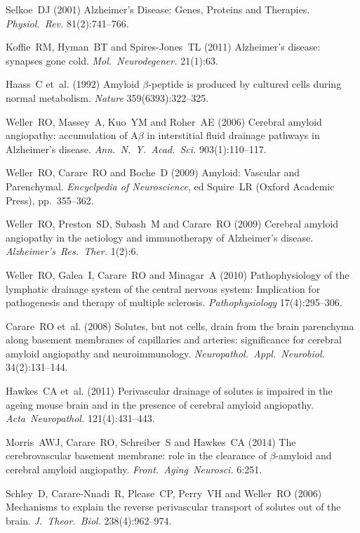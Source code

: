 \documentclass[a4paper,titlepage]{scrartcl}
\begin{document}
\begin{thebibliography}{10}
Selkoe~DJ (2001) Alzheimer's Disease: Genes, Proteins and Therapies. {\em Physiol.~Rev.} 81(2):741--766.

Koffie~RM, Hyman~BT and Spires-Jones~TL (2011) Alzheimer's disease: synapses gone cold. {\em Mol.~Neurodegener.} 21(1):63.

Haass~C et~al. (1992) Amyloid $\beta$-peptide is produced by cultured cells during normal metabolism. {\em Nature} 359(6393):322--325.

Weller~RO, Massey~A, Kuo~YM and Roher~AE (2006) Cerebral amyloid angiopathy: accumulation of A$\beta$ in interstitial fluid drainage pathways in Alzheimer's disease. {\em Ann.~N.~Y.~Acad.~Sci.} 903(1):110--117.

Weller~RO, Carare~RO and Boche~D (2009) Amyloid: Vascular and Parenchymal. {\em Encyclpedia of Neuroscience}, ed Squire~LR (Oxford Academic Press), pp.~355--362.

Weller~RO, Preston~SD, Subash~M and Carare~RO (2009) Cerebral amyloid angiopathy in the aetiology and immunotherapy of Alzheimer's disease. {\em Alzheimer's~Res.~Ther.} 1(2):6.

Weller~RO, Galea~I, Carare~RO and Minagar~A (2010) Pathophysiology of the lymphatic drainage system of the central nervous system: Implication for pathogenesis and therapy of multiple sclerosis. {\em Pathophysiology} 17(4):295--306.

Carare~RO et~al. (2008) Solutes, but not cells, drain from the brain parenchyma along basement membranes of capillaries and arteries: significance for cerebral amyloid angiopathy and neuroimmunology. {\em Neuropathol.~Appl.~Neurobiol.} 34(2):131--144.

Hawkes~CA et~al. (2011) Perivascular drainage of solutes is impaired in the ageing mouse brain and in the presence of cerebral amyloid angiopathy. {\em Acta~Neuropathol.} 121(4):431--443.

Morris~AWJ, Carare~RO, Schreiber~S and Hawkes~CA (2014) The cerebrovascular basement membrane: role in the clearance of $\beta$-amyloid and cerebral amyloid angiopathy. {\em Front.~Aging~Neurosci.} 6:251.

Schley~D, Carare-Nnadi~R, Please~CP, Perry~VH and Weller~RO (2006) Mechanisms to explain the reverse perivascular transport of solutes out of the brain. {\em J.~Theor.~Biol.} 238(4):962--974.


\end{thebibliography}
\end{document}
